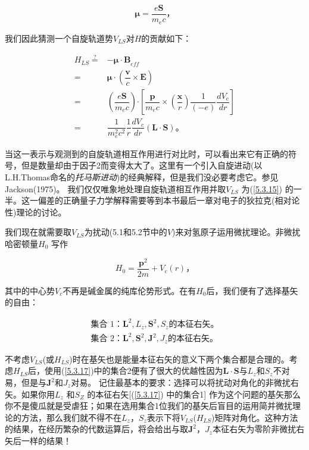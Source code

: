 ﻿\documentclass[UTF8,twoside]{ctexart}
\begin{document}
\begin{equation} \label{5.3.14}
{\boldsymbol{\mu}}=\dfrac{e\boldsymbol{S}}{m_e c}\text{，}
\end{equation}

\noindent 我们因此猜测一个自旋轨道势$V_{LS}$对$H$的贡献如下：

\begin{equation} \label{5.3.15}
\begin{split}
H_{LS}\overset{?}{=}&-{\boldsymbol{\mu\cdot B}_{e\!f\!f}} \\
=&{\boldsymbol{\mu\cdot}}\left(\dfrac{\boldsymbol{v}}{c}\times {\boldsymbol{E}}\right) \\
=&\left(\dfrac{e\boldsymbol{S}}{m_ec}\right)\boldsymbol{\cdot} \left[\dfrac{\boldsymbol{p}}{m_e c}\times \left(\dfrac{\boldsymbol{x}}{r}\right)\dfrac{1}{(-e)}\dfrac{dV_c}{dr}\right] \\
=&\dfrac{1}{m_e^2c^2}\dfrac{1}{r}\dfrac{dV_c}{dr}({\boldsymbol{L\cdot S}})\text{。}
\end{split}
\end{equation}

\noindent 当这一表示与观测到的自旋轨道相互作用进行对比时，可以看出来它有正确的符号，但是数量却由于因子2而变得太大了。这里有一个引入自旋进动(以L.H.Thomas命名的\emph{托马斯进动})的经典解释，但是我们没必要考虑它。参见Jackson(1975)。 我们仅仅唯象地处理自旋轨道相互作用并取$V_{LS}$ 为(\ref{5.3.15}) 的一半。这一偏差的正确量子力学解释需要等到本书最后一章对电子的狄拉克(相对论性)理论的讨论。

我们现在就需要取$V_{LS}$为扰动(5.1和5.2节中的$V$)来对氢原子运用微扰理论。非微扰哈密顿量$H_0$ 写作

\begin{equation} \label{5.3.16}
H_0=\dfrac{\boldsymbol{p}^2}{2m}+V_c(r)\text{，}
\end{equation}

\noindent 其中的中心势$V_c$不再是碱金属的纯库伦势形式。在有$H_0$后，我们便有了选择基矢的自由：

\begin{equation} \label{5.3.17}
\begin{split}
\text{集合 1：}{\boldsymbol{L}}^2,L_z,{\boldsymbol{S}}^2,S_z\text{的本征右矢。} \\
\text{集合 2：}{\boldsymbol{L}}^2,{\boldsymbol{S}}^2,{\boldsymbol{J}}^2,J_z\text{的本征右矢。}
\end{split}
\end{equation}

\noindent 不考虑$V_{LS}$(或$H_{LS}$)时在基矢也是能量本征右矢的意义下两个集合都是合理的。考虑$H_{LS}$后，使用(\ref{5.3.17})中的集合2便有了很大的优越性因为$\boldsymbol{L\cdot S}$与$L_z$和$S_z$不对易，但是与$\boldsymbol{J}^2$和$J_z$对易。 记住最基本的要求：选择可以将扰动对角化的非微扰右矢。如果你用$L_z$ 和$S_Z $ 的本征右矢[(\ref{5.3.17}) 中的集合1] 作为这个问题的基矢那么你不是傻瓜就是受虐狂；如果在选用集合1位我们的基矢后盲目的运用简并微扰理论的方法，那么我们就不得不在$L_z$，$S_z$表示下将$V_{LS}$($H_{LS}$)矩阵对角化。这种方法的结果，在经历繁杂的代数运算后，将会给出与取$\boldsymbol{J}^2$，$J_z$本征右矢为零阶非微扰右矢后一样的结果！
\end{document}
